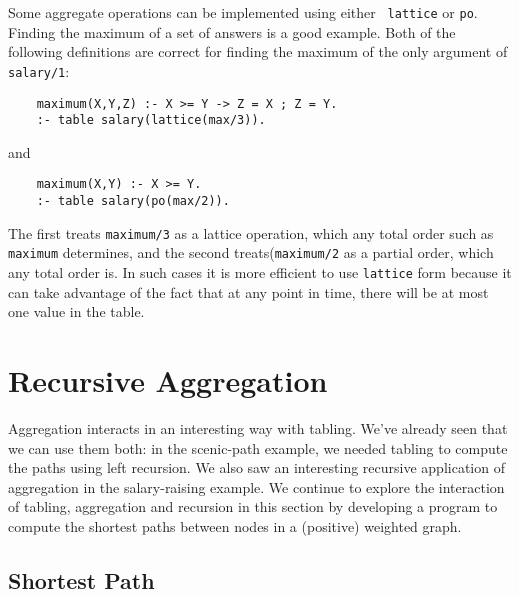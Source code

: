 Some aggregate operations can be implemented using either {\tt
  lattice} or {\tt po}.  Finding the maximum of a set of answers is a
good example. Both of the following definitions are correct for
finding the maximum of the only argument of {\tt salary/1}:
\begin{verbatim}
    maximum(X,Y,Z) :- X >= Y -> Z = X ; Z = Y.
    :- table salary(lattice(max/3)).
\end{verbatim}
and
\begin{verbatim}
    maximum(X,Y) :- X >= Y.
    :- table salary(po(max/2)).
\end{verbatim}
The first treats {\tt maximum/3} as a lattice operation, which any
total order such as {\tt maximum} determines, and the second
treats({\tt maximum/2} as a partial order, which any total order is.
In such cases it is more efficient to use {\tt lattice} form because
it can take advantage of the fact that at any point in time, there
will be at most one value in the table.

\section{Recursive Aggregation}

Aggregation interacts in an interesting way with tabling.  We've
already seen that we can use them both: in the scenic-path example, we
needed tabling to compute the paths using left recursion.  We also saw
an interesting recursive application of aggregation in the
salary-raising example.  We continue to explore the interaction of
tabling, aggregation and recursion in this section by developing a
program to compute the shortest paths between nodes in a (positive)
weighted graph.

\subsection{Shortest Path}


